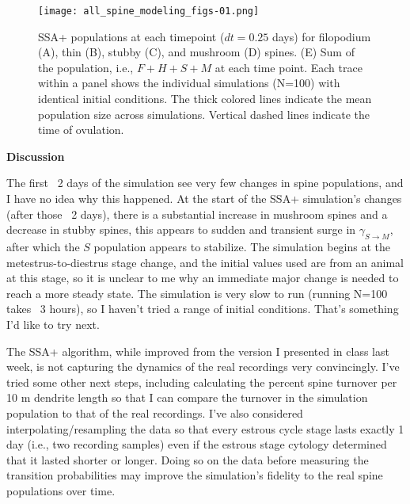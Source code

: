 \documentclass[11pt]{article}
\begin{document}
\begin{figure}
	\centering
	\texttt{[image: all\_spine\_modeling\_figs-01.png]}
	\caption{SSA+ populations at each timepoint ($dt=0.25$ days) for filopodium (A), thin (B), stubby (C), and mushroom (D) spines. (E) Sum of the population, i.e., $F+H+S+M$ at each time point. Each trace within a panel shows the individual simulations (N=100) with identical initial conditions. The thick colored lines indicate the mean population size across simulations. Vertical dashed lines indicate the time of ovulation.}
	\label{simout}
\end{figure}

\vspace{10pt}
\noindent \textbf{Discussion}

The first ~2 days of the simulation see very few changes in spine populations, and I have no idea why this happened. At the start of the SSA+ simulation's changes (after those ~2 days), there is a substantial increase in mushroom spines and a decrease in stubby spines, this appears to sudden and transient surge in $\gamma_{S\to M}$, after which the $S$ population appears to stabilize. The simulation begins at the metestrus-to-diestrus stage change, and the initial values used are from an animal at this stage, so it is unclear to me why an immediate major change is needed to reach a more steady state. The simulation is very slow to run (running N=100 takes ~3 hours), so I haven't tried a range of initial conditions. That's something I'd like to try next.

The SSA+ algorithm, while improved from the version I presented in class last week, is not capturing the dynamics of the real recordings very convincingly. I've tried some other next steps, including calculating the percent spine turnover per 10 \textmu m dendrite length so that I can compare the turnover in the simulation population to that of the real recordings. I've also considered interpolating/resampling the data so that every estrous cycle stage lasts exactly 1 day (i.e., two recording samples) even if the estrous stage cytology determined that it lasted shorter or longer. Doing so on the data before measuring the transition probabilities may improve the simulation's fidelity to the real spine populations over time.
\end{document}
